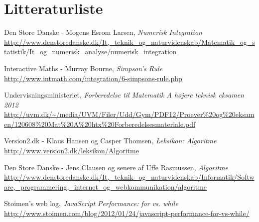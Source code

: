 \documentclass[12pt]{article}
\numberwithin{equation}{section}
\begin{document}
\clearpage
\section{Litteraturliste}
\begin{thebibliography}{9}
	Den Store Danske - Mogens Esrom Larsen,
	\emph{Numerisk Integration}
	\url{http://www.denstoredanske.dk/It,_teknik_og_naturvidenskab/Matematik_og_statistik/It_og_numerisk_analyse/numerisk_integration}
	

	Interactive Maths - Murray Bourne,
	\emph{Simpson's Rule}
	\url{http://www.intmath.com/integration/6-simpsons-rule.php}
	
	Undervisningsministeriet,
	\emph{Forberedelse til Matematik A højere teknisk eksamen 2012}
	\url{http://uvm.dk/~/media/UVM/Filer/Udd/Gym/PDF12/Proever\%20og\%20eksamen/120608\%20Mat\%20A\%20htx\%20Forberedelsesmateriale.pdf}
	
	Version2.dk - Klaus Hansen og Casper Thomsen,
	\emph{Leksikon: Algoritme}
	\url{http://www.version2.dk/leksikon/Algoritme}
	
	Den Store Danske - Jens Clausen og senere af Uffe Rasmussen,
	\emph{Algoritme}
	\url{http://www.denstoredanske.dk/It,_teknik_og_naturvidenskab/Informatik/Software,_programmering,_internet_og_webkommunikation/algoritme}

	Stoimen's web log,
	\emph{JavaScript Performance: for vs. while}
	\url{http://www.stoimen.com/blog/2012/01/24/javascript-performance-for-vs-while/}
\end{thebibliography}
\end{document}
